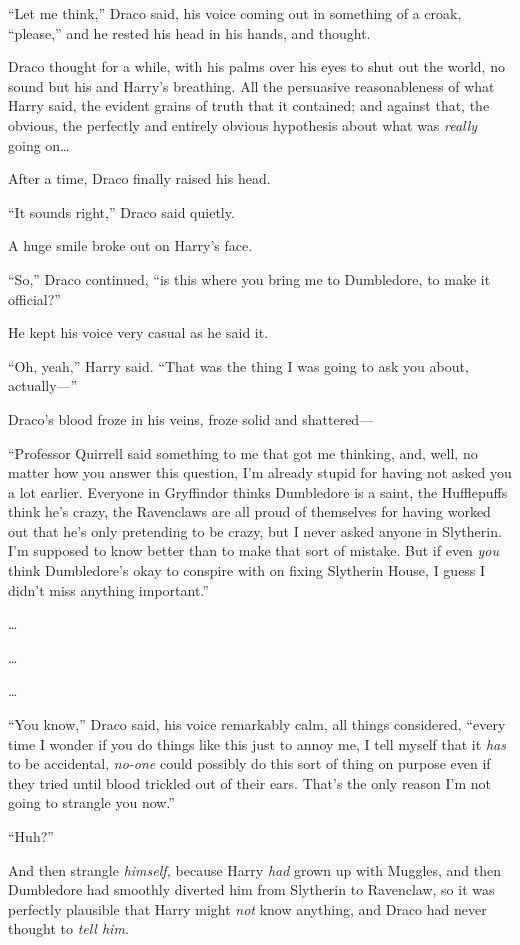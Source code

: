 “Let me think,” Draco said, his voice coming out in something of a croak, “please,” and he rested his head in his hands, and thought.

\later

Draco thought for a while, with his palms over his eyes to shut out the world, no sound but his and Harry’s breathing. All the persuasive reasonableness of what Harry said, the evident grains of truth that it contained; and against that, the obvious, the perfectly and entirely obvious hypothesis about what was \emph{really} going on…

After a time, Draco finally raised his head.

“It sounds right,” Draco said quietly.

A huge smile broke out on Harry’s face.

“So,” Draco continued, “is this where you bring me to Dumbledore, to make it official?”

He kept his voice very casual as he said it.

“Oh, yeah,” Harry said. “That was the thing I was going to ask you about, actually—”

Draco’s blood froze in his veins, froze solid and shattered—

“Professor Quirrell said something to me that got me thinking, and, well, no matter how you answer this question, I’m already stupid for having not asked you a lot earlier. Everyone in Gryffindor thinks Dumbledore is a saint, the Hufflepuffs think he’s crazy, the Ravenclaws are all proud of themselves for having worked out that he’s only pretending to be crazy, but I never asked anyone in Slytherin. I’m supposed to know better than to make that sort of mistake. But if even \emph{you} think Dumbledore’s okay to conspire with on fixing Slytherin House, I guess I didn’t miss anything important.”

…

…

…

“You know,” Draco said, his voice remarkably calm, all things considered, “every time I wonder if you do things like this just to annoy me, I tell myself that it \emph{has} to be accidental, \emph{no-one} could possibly do this sort of thing on purpose even if they tried until blood trickled out of their ears. That’s the only reason I’m not going to strangle you now.”

“Huh?”

And then strangle \emph{himself,} because Harry \emph{had} grown up with Muggles, and then Dumbledore had smoothly diverted him from Slytherin to Ravenclaw, so it was perfectly plausible that Harry might \emph{not} know anything, and Draco had never thought to \emph{tell him.}

